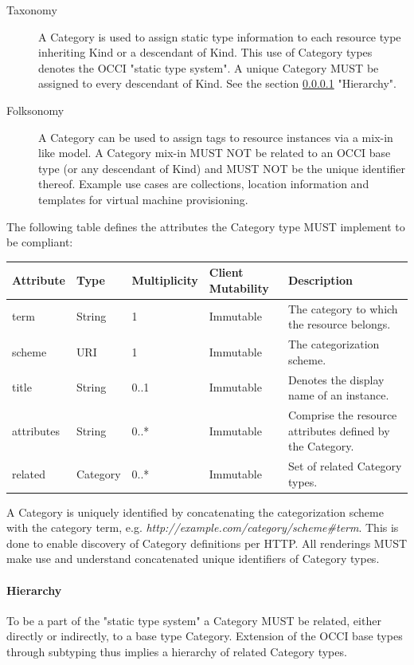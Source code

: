 \documentclass[10pt,a4paper]{article}
\begin{document}
\begin{description}
\item[Taxonomy] A Category is used to assign static type information
  to each resource type inheriting Kind or a descendant of Kind. This
  use of Category types denotes the OCCI "static type system". A
  unique Category MUST be assigned to every descendant of Kind. See
  the section \ref{sec:hierarchy} "Hierarchy".
\item[Folksonomy] A Category can be used to assign tags to resource
  instances via a mix-in like model. A Category mix-in MUST NOT be
  related to an OCCI base type (or any descendant of Kind) and MUST
  NOT be the unique identifier thereof.  Example use cases are
  collections, location information and templates for virtual machine
  provisioning.
\end{description}

The following table defines the attributes the Category type MUST
implement to be compliant:

\begin{tabular}{l|l|l|l|p{2.7in}}
Attribute & Type & Multiplicity & Client Mutability & Description \\
\hline
term & String & 1 & Immutable & The category to which the resource belongs. \\
scheme & URI & 1 & Immutable & The categorization scheme. \\
title & String & 0..1 & Immutable & Denotes the display name of an instance. \\
attributes & String & 0..* & Immutable & Comprise the resource attributes defined by the Category. \\
related & Category & 0..* & Immutable & Set of related Category types. \\
\end{tabular}

A Category is uniquely identified by concatenating the categorization
scheme with the category term,
e.g. \textit{http://example.com/category/scheme\#term}.  This is done
to enable discovery of Category definitions per HTTP. All renderings
MUST make use and understand concatenated unique identifiers of
Category types.

\paragraph{Hierarchy}
\label{sec:hierarchy}
To be a part of the "static type system" a Category MUST be related,
either directly or indirectly, to a base type Category. Extension of
the OCCI base types through subtyping thus implies a hierarchy of
related Category types.
\end{document}
